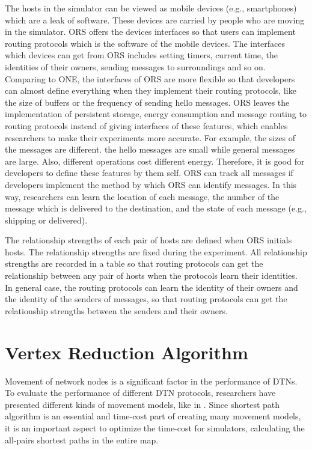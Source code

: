 The hosts in the simulator can be viewed as mobile devices (e.g., smartphones) which are a leak of software. These devices are carried by people who are moving in the simulator. ORS offers the devices interfaces so that users can implement routing protocols which is the software of the mobile devices. The interfaces which devices can get from ORS includes setting timers, current time, the identities of their owners, sending messages to surroundings and so on. Comparing to ONE, the interfaces of ORS are more flexible so that developers can almost define everything when they implement their routing protocols, like the size of buffers or the frequency of sending hello messages. ORS leaves the implementation of persistent storage, energy consumption and message routing to routing protocols instead of giving interfaces of these features, which enables researchers to make their experiments more accurate. For example, the sizes of the messages are different. the hello messages are small while general messages are large. Also, different operations cost different energy. Therefore, it is good for developers to define these features by them self. ORS can track all messages if developers implement the method by which ORS can identify messages. In this way, researchers can learn the location of each message, the number of the message which is delivered to the destination, and the state of each message (e.g., shipping or delivered).

The relationship strengths of each pair of hosts are defined when ORS initials hosts. The relationship strengths are fixed during the experiment. All relationship strengths are recorded in a table so that routing protocols can get the relationship between any pair of hosts when the protocols learn their identities. In general case, the routing protocols can learn the identity of their owners and the identity of the senders of messages, so that routing protocols can get the relationship strengths between the senders and their owners.


\section{Vertex Reduction Algorithm}

\noindent Movement of network nodes is a significant factor in the performance of DTNs. To evaluate the performance of different DTN protocols, researchers have presented different kinds of movement models, like in \cite{C32}. Since shortest path algorithm is an essential and time-cost part of creating many movement models, it is an important aspect to optimize the time-cost for simulators, calculating the all-pairs shortest paths in the entire map.

